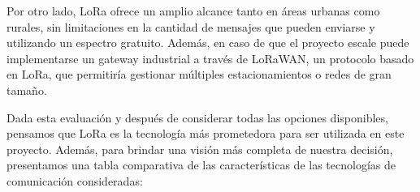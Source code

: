 Por otro lado, LoRa ofrece un amplio alcance tanto en áreas urbanas como rurales, sin limitaciones en la cantidad de mensajes que pueden enviarse y utilizando un espectro gratuito. Además, en caso de que el proyecto escale puede implementarse un gateway industrial a través de LoRaWAN, un protocolo basado en LoRa, que permitiría gestionar múltiples estacionamientos o redes de gran tamaño.

Dada esta evaluación y después de considerar todas las opciones disponibles, pensamos que LoRa es la tecnología más prometedora para ser utilizada en este proyecto. Además, para brindar una visión más completa de nuestra decisión, presentamos una tabla comparativa de las características de las tecnologías de comunicación consideradas:

\enabletablerowcolor[2] %
